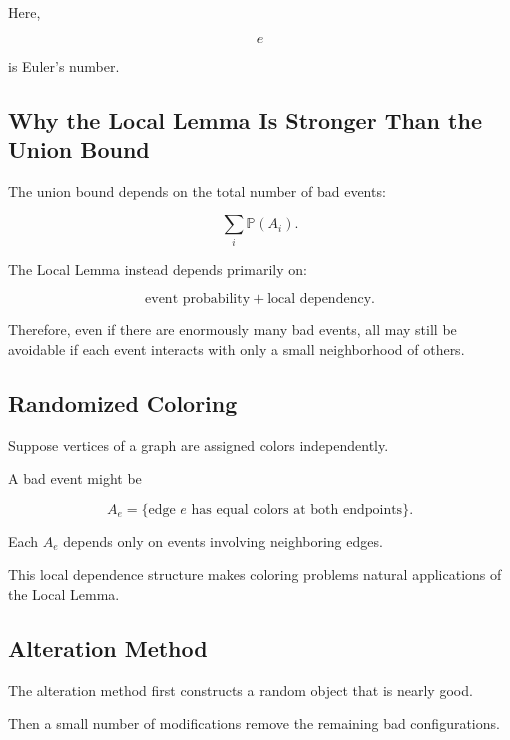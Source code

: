 Here,

\[
e
\]

is Euler's number.

\subsection{Why the Local Lemma Is Stronger Than the Union Bound}
\label{subsec:local-lemma-versus-union-bound}

The union bound depends on the total number of bad events:

\[
\sum_i\mathbb{P}(A_i).
\]

The Local Lemma instead depends primarily on:

\[
\boxed{
\text{event probability}
+
\text{local dependency}.
}
\]

Therefore, even if there are enormously many bad events, all may still
be avoidable if each event interacts with only a small neighborhood of
others.

\subsection{Randomized Coloring}
\label{subsec:randomized-coloring}

Suppose vertices of a graph are assigned colors independently.

A bad event might be

\[
A_e
=
\{\text{edge }e\text{ has equal colors at both endpoints}\}.
\]

Each \(A_e\) depends only on events involving neighboring edges.

This local dependence structure makes coloring problems natural
applications of the Local Lemma.

\subsection{Alteration Method}
\label{subsec:alteration-method-probabilistic}

The alteration method first constructs a random object that is nearly
good.

Then a small number of modifications remove the remaining bad
configurations.

